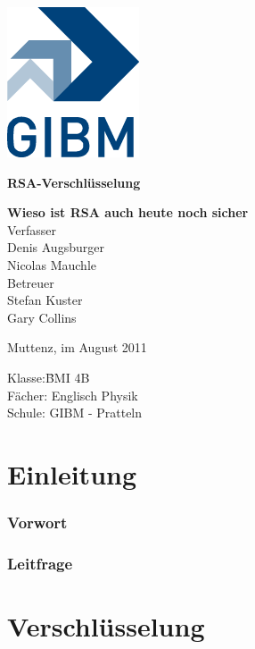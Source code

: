 \documentclass[12pt,a4paper,german]{article}
\begin{document}
\begin{titlepage}
\sffamily
\centering
\includegraphics{images/gibm_logo.png}

\vfill
{\bfseries\Huge RSA-Verschlüsselung}\\
\vfill

{\bfseries\Large Wieso ist RSA auch heute noch sicher}\\
\vfill
Verfasser\\[1ex]
Denis Augsburger\\
Nicolas Mauchle\\
\vfill
Betreuer\\[1ex]
{\large Stefan Kuster}\\
{\large Gary Collins}\\
\vfill

\raggedright
\small
Muttenz, im August 2011\\[2cm]
\begin{tabbing}
Klasse:\quad\quad\quad \=BMI 4B\\
Fächer: \> Englisch Physik \\
Schule: \> GIBM - Pratteln
\end{tabbing}
\end{titlepage}


\tableofcontents

\newpage
\part{Einleitung}
\section{Vorwort}
\section{Leitfrage}

\newpage
\part{Verschlüsselung}
\end{document}
